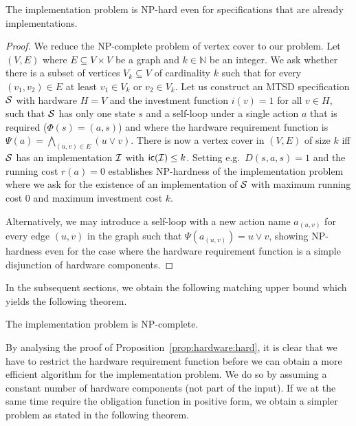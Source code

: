 \begin{proposition} \label{prop:hardware:hard}
The implementation problem is NP-hard even for specifications that are 
already implementations.
\end{proposition}
\begin{proof}
We reduce the NP-complete problem of vertex cover to our problem. 
Let $(V,E)$ where $E \subseteq V\times V$ 
be a graph and $k\in\mathbb N$ be an integer. We ask
whether there is a subset of vertices $V_k \subseteq V$ 
of cardinality $k$ such that for every $(v_1,v_2) \in E$
at least $v_1 \in V_k$ or $v_2 \in V_k$. Let us construct 
an MTSD specification $\mathcal S$ with hardware $H=V$ and the investment function
$i(v) = 1$ for all $v \in H$, such that
$\mathcal S$ has only one state $s$ and a self-loop under a single action $a$ 
that is required ($\Phi(s)=(a,s)$)
and where the hardware requirement function is 
$\Psi(a)=\bigwedge_{(u,v)\in E}(u\vee v)$.
There is now a vertex cover in $(V,E)$ of size $k$ iff 
$\mathcal S$ has an implementation $\mathcal I$ with $\mathsf{ic}(\mathcal I)\leq k$.
Setting e.g.~$D(s,a,s) = 1$ and the running cost $r(a)=0$
establishes NP-hardness of the 
implementation problem where we ask for the existence of an implementation
of $\mathcal S$ with maximum running cost $0$ and maximum investment cost $k$.

Alternatively, we may introduce a self-loop with 
a new action name $a_{(u,v)}$ 
for every edge $(u,v)$
in the graph such that $\Psi(a_{(u,v)})= u \vee v$, 
showing NP-hardness even for the
case where the hardware requirement function is a simple disjunction
of hardware components.
\end{proof}


In the subsequent sections, we 
obtain the following matching upper bound which yields the following theorem.

\begin{theorem}\label{thm:NP}
The implementation problem is NP-complete.
\end{theorem}

By analysing the proof of Proposition~\ref{prop:hardware:hard},
it is clear that we have to restrict the hardware requirement function
before we can obtain a more efficient algorithm for the implementation problem.
We do so by assuming a constant number of hardware components
(not part of the input).
If we at the same time require the obligation function in 
positive form, we obtain a simpler problem as stated in the following theorem.

